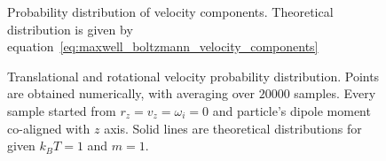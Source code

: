 \begin{figure}[t]
\begin{minipage}[c]{0.7\columnwidth}
		\caption{Probability distribution of velocity components. Theoretical distribution is given by equation~\eqref{eq:maxwell_boltzmann_velocity_components}}
	\end{minipage}
	\caption{Translational and rotational velocity probability distribution. Points are obtained numerically, with averaging over $20000$ samples. Every sample started from $r_z = v_z = \omega_i = 0$ and particle's dipole moment co-aligned with $z$ axis. Solid lines are theoretical distributions for given $k_BT = 1$ and $m = 1$.}
	\label{fig:velocity_distributions}
\end{figure}